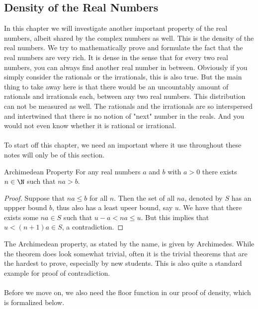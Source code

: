 \subsection{Density of the Real Numbers}
In this chapter we will investigate another important property of the real numbers, albeit shared by the complex numbers as well. This is the density of the real numbers. We try to mathematically prove and formulate the fact that the real numbers are very rich. It is dense in the sense that for every two real numbers, you can always find another real number in between. Obviously if you simply consider the rationals or the irrationals, this is also true. But the main thing to take away here is that there would be an uncountably amount of rationals and irrationals each, between any two real numbers. This distribution can not be measured as well. The rationals and the irrationals are so interspersed and intertwined that there is no notion of "next" number in the reals. And you would not even know whether it is rational or irrational. \\~\\

To start off this chapter, we need an important where it use throughout these notes will only be of this section. 

\begin{thm}{Archimedean Property}{} For any real numbers $a$ and $b$ with $a>0$ there exists $n\in\N$ such that $na>b$. \tcbline
\begin{proof} Suppose that $na\leq b$ for all $n$. Then the set of all $na$, denoted by $S$ has an uppper bound $b$, thus also has a least upeer bound, say $u$. We have that there exists some $na\in S$ such that $u-a<na\leq u$. But this implies that $u<(n+1)a\in S$, a contradiction. 
\end{proof}
\end{thm}

The Archimedean property, as stated by the name, is given by Archimedes. While the theorem does look somewhat trivial, often it is the trivial theorems that are the hardest to prove, especially by new students. This is also quite a standard example for proof of contradiction. \\~\\

Before we move on, we also need the floor function in our proof of density, which is formalized below. 

